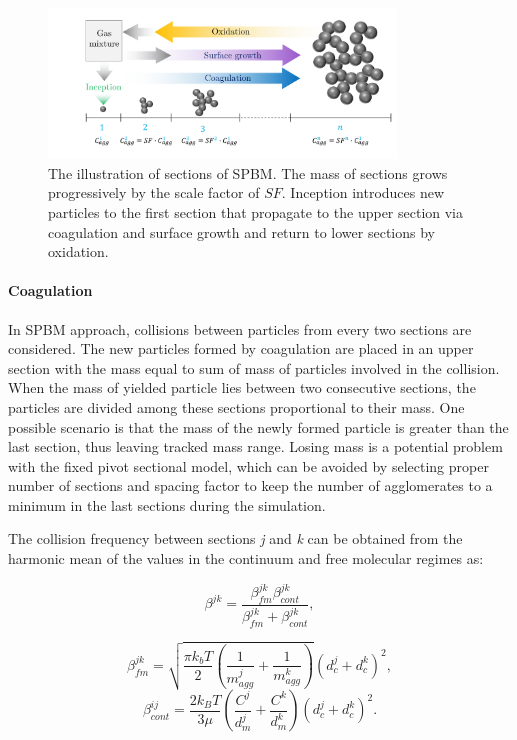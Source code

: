 \begin{figure}[!htbp]
	\centering
	\includegraphics[height=40mm, ]{Figures/Theory/Sectional.pdf}
	\caption{The illustration of sections of SPBM. The mass of sections grows progressively by the scale factor of $SF$. Inception introduces new particles to the first section that propagate to the upper section via coagulation and surface growth and return to lower sections by oxidation.}
	\label{fig:sectional}
\end{figure}

\paragraph{Coagulation}
\label{sec:sectcoag}
In SPBM approach, collisions between particles from every two sections are considered. The new particles formed by coagulation are placed in an upper section with the mass equal to sum of mass of particles involved in the collision. When the mass of yielded particle lies between two consecutive sections, the particles are divided among these sections proportional to their mass. One possible scenario is that the mass of the newly formed particle is greater than the last section, thus leaving tracked mass range. Losing mass is a potential problem with the fixed pivot sectional model, which can be avoided by selecting proper number of sections and spacing factor to keep the number of agglomerates to a minimum in the last sections during the simulation.

 The collision frequency between sections \textit{j} and \textit{k} can be obtained from the harmonic mean of the values in the continuum and free molecular regimes as:

\begin{equation}
	\beta^{jk} = 				       \frac{\beta^{jk}_{fm}\beta^{jk}_{cont}}{\beta^{jk}_{fm}
		+\beta^{jk}_{cont}}
	\label{eqn:betahmsect},
\end{equation}

\begin{equation}
	\beta^{jk}_{fm} =
	\sqrt{
		\frac{\pi k_b T}{2}
		\left(
			\frac{1}{m^j_{agg}}+
			\frac{1}{m^k_{agg}}
		\right)
	} 
	\left(
		d^j_c+d^k_c
	\right)^2
	\label{eqn:betafmsect},
\end{equation}
\begin{equation}
	\beta^{ij}_{cont} = \frac{2k_BT}{3\mu}
	\left(
		\frac{C^j}{d^j_m}+
		\frac{C^k}{d^k_m}
	\right)
	\left(
		d^j_c+d^k_c
	\right)^2
	\label{eqn:betacontsect}.
\end{equation}

